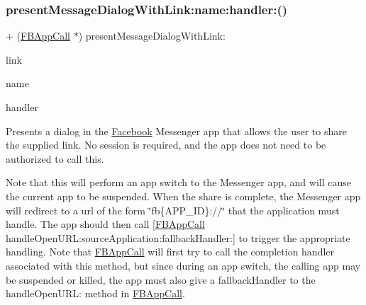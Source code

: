 \subsubsection{\texorpdfstring{present\+Message\+Dialog\+With\+Link\+:name\+:handler\+:()}{presentMessageDialogWithLink:name:handler:()}\hspace{0.1cm}{\footnotesize\ttfamily [5/5]}}
{\footnotesize\ttfamily + (\hyperlink{interfaceFBAppCall}{F\+B\+App\+Call} $\ast$) present\+Message\+Dialog\+With\+Link\+: \begin{DoxyParamCaption}\item[{(N\+S\+U\+RL $\ast$)}]{link }\item[{name:(N\+S\+String $\ast$)}]{name }\item[{handler:(F\+B\+Dialog\+App\+Call\+Completion\+Handler)}]{handler }\end{DoxyParamCaption}}

Presents a dialog in the \hyperlink{interfaceFacebook}{Facebook} Messenger app that allows the user to share the supplied link. No session is required, and the app does not need to be authorized to call this.

Note that this will perform an app switch to the Messenger app, and will cause the current app to be suspended. When the share is complete, the Messenger app will redirect to a url of the form \char`\"{}fb\{\+A\+P\+P\+\_\+\+I\+D\}\+://\char`\"{} that the application must handle. The app should then call \mbox{[}\hyperlink{interfaceFBAppCall}{F\+B\+App\+Call} handle\+Open\+U\+R\+L\+:source\+Application\+:fallback\+Handler\+:\mbox{]} to trigger the appropriate handling. Note that \hyperlink{interfaceFBAppCall}{F\+B\+App\+Call} will first try to call the completion handler associated with this method, but since during an app switch, the calling app may be suspended or killed, the app must also give a fallback\+Handler to the handle\+Open\+U\+RL\+: method in \hyperlink{interfaceFBAppCall}{F\+B\+App\+Call}.



